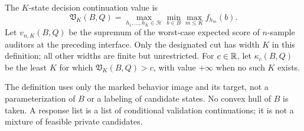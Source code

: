 \begin{definition}
\label{def:v20-spectrum}
The $K$-state decision continuation value is
\begin{equation}\label{eq:v20-spectrum}
 \mathfrak V_K(B,Q)=
 \max_{h_1,\ldots,h_K\in\mathcal H}
 \min_{b\in B}\max_{m\le K} f_{h_m}(b).
\end{equation}
Let $v_{n,K}(B,Q)$ be the supremum of the worst-case expected score of
$n$-sample auditors at the preceding interface. Only the designated cut
has width $K$ in this definition; all other widths are finite but
unrestricted. For $c\in\mathbb R$, let $\kappa_c(B,Q)$ be the least $K$ for
which $\mathfrak V_K(B,Q)>c$, with value $+\infty$ when no such $K$
exists.
\end{definition}
The definition uses only the marked behavior image and its target, not a
parameterization of $B$ or a labeling of candidate states. No convex hull
of $B$ is taken. A response list is a list of conditional validation
continuations; it is not a mixture of feasible private candidates.

